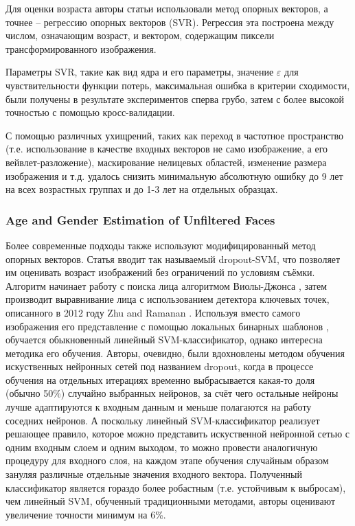Для оценки возраста авторы статьи использовали метод опорных векторов, а точнее -- регрессию опорных векторов (SVR). Регрессия эта построена между числом, означающим возраст, и вектором, содержащим пиксели трансформированного изображения.

Параметры SVR, такие как вид ядра и его параметры, значение $ \varepsilon $ для чувствительности функции потерь, максимальная ошибка в критерии сходимости, были получены в результате экспериментов сперва грубо, затем с более высокой точностью с помощью кросс-валидации.

С помощью различных ухищрений, таких как переход в частотное пространство (т.е. использование в качестве входных векторов не само изображение, а его вейвлет-разложение), маскирование нелицевых областей, изменение размера изображения и т.д. удалось снизить минимальную абсолютную ошибку до 9 лет на всех возрастных группах и до 1-3 лет на отдельных образцах.

\subsubsection{Age and Gender Estimation of Unfiltered Faces}
Более современные подходы также используют модифицированный метод опорных векторов. Статья \cite{svm_dropout} вводит так называемый dropout-SVM, что позволяет им оценивать возраст изображений без ограничений по условиям съёмки. Алгоритм начинает работу с поиска лица алгоритмом Виолы-Джонса \cite{viola_jones}, затем производит выравнивание лица с использованием детектора ключевых точек, описанного в 2012 году Zhu and Ramanan \cite{zhu_ramanan}. Используя вместо самого изображения его представление с помощью локальных бинарных шаблонов \cite{lbp}, обучается обыкновенный линейный SVM-классификатор, однако интересна методика его обучения. Авторы, очевидно, были вдохновлены методом обучения искуственных нейронных сетей под названием dropout, когда в процессе обучения на отдельных итерациях временно выбрасывается какая-то доля (обычно 50\%) случайно выбранных нейронов, за счёт чего остальные нейроны лучше адаптируются к входным данным и меньше полагаются на работу соседних нейронов. А поскольку линейный SVM-классификатор реализует решающее правило, которое можно представить искуственной нейронной сетью с одним входным слоем и одним выходом, то можно провести аналогичную процедуру для входного слоя, на каждом этапе обучения случайным образом зануляя различные отдельные значения входного вектора. Полученный классификатор является гораздо более робастным (т.е. устойчивым к выбросам), чем линейный SVM, обученный традиционными методами, авторы оценивают увеличение точности минимум на 6\%.

